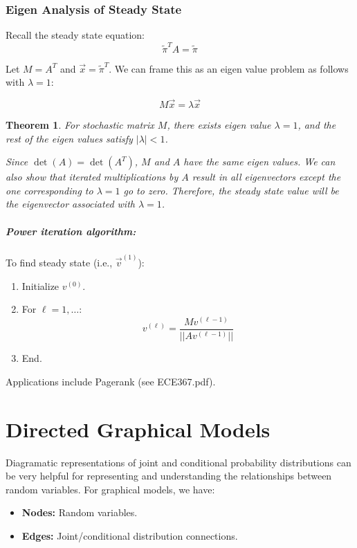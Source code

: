 \documentclass[a4paper,12pt]{report}
\newtheorem{theorem}{Theorem}
\begin{document}
\subsection{Eigen Analysis of Steady State}

Recall the steady state equation: 
\begin{equation}
\tilde \pi^T A = \tilde\pi
\end{equation}

Let $M = A^T$ and $\vec x = \tilde\pi^T$. We can frame this as an eigen value problem as follows with $\lambda = 1$:

\begin{equation}
M\vec x = \lambda \vec x
\end{equation}

\begin{theorem}{}
For stochastic matrix $M$, there exists eigen value $\lambda = 1$, and the rest of the eigen values satisfy $|\lambda| < 1$.


Since $\det(A) = \det(A^T)$, $M$ and $A$ have the same eigen values. We can also show that iterated multiplications by $A$ result in all eigenvectors except the one corresponding to $\lambda = 1$ go to zero. Therefore, the steady state value will be the eigenvector associated with $\lambda =1$.
\end{theorem}

\paragraph{Power iteration algorithm: } To find steady state (i.e., $\vec v^{(1)}$): 

\begin{enumerate}
\item Initialize $v^{(0)}$.
\item For $\ell = 1, \dots$:
\begin{equation}
v^{(\ell)} = \frac{Mv^{(\ell-1)}}{||Av^{(\ell-1)}||} 
\end{equation}
\item End.
\end{enumerate}

Applications include Pagerank (see ECE367.pdf).




\chapter{Directed Graphical Models}

Diagramatic representations of joint and conditional probability distributions can be very helpful for representing and understanding the relationships between random variables. For graphical models, we have:
\begin{itemize}
\item \textbf{Nodes:} Random variables.
\item \textbf{Edges:} Joint/conditional distribution connections.
\end{itemize}
\end{document}

